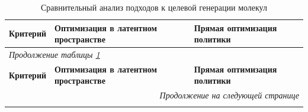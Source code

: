 
\begin{longtable}{|p{40mm}|>{\RaggedRight}X|>{\RaggedRight}X|}

\caption{Сравнительный анализ подходов к целевой генерации молекул}
\label{tab:final_comparison} \\

\hline
\textbf{Критерий} & \textbf{Оптимизация в латентном пространстве} & \textbf{Прямая оптимизация политики} \\ 
\hline
\endfirsthead

\multicolumn{3}{l}{\small\textit{Продолжение таблицы \ref{tab:final_comparison}}} \\
\hline
\textbf{Критерий} & \textbf{Оптимизация в латентном пространстве} & \textbf{Прямая оптимизация политики} \\ 
\hline
\endhead

\hline
\multicolumn{3}{r}{\small\textit{Продолжение на следующей странице}} \\
\endfoot

\hline
\endlastfoot




\end{longtable}

